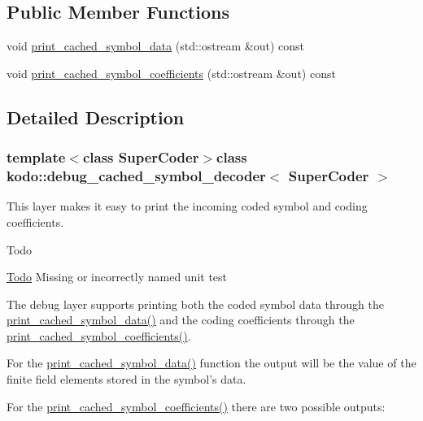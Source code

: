 \subsection*{Public Member Functions}
\begin{DoxyCompactItemize}
\item 
void \hyperlink{classkodo_1_1debug__cached__symbol__decoder_a1efd2cdeeaa51cf7ff3bb407ae0ffeba}{print\-\_\-cached\-\_\-symbol\-\_\-data} (std\-::ostream \&out) const 
\item 
void \hyperlink{classkodo_1_1debug__cached__symbol__decoder_ab805295f514e7fbfac57b8a6d6f45a62}{print\-\_\-cached\-\_\-symbol\-\_\-coefficients} (std\-::ostream \&out) const 
\end{DoxyCompactItemize}


\subsection{Detailed Description}
\subsubsection*{template$<$class Super\-Coder$>$class kodo\-::debug\-\_\-cached\-\_\-symbol\-\_\-decoder$<$ Super\-Coder $>$}

This layer makes it easy to print the incoming coded symbol and coding coefficients. 

\begin{DoxyRefDesc}{Todo}
\item[\hyperlink{todo__todo000005}{Todo}]Missing or incorrectly named unit test\end{DoxyRefDesc}
The debug layer supports printing both the coded symbol data through the \hyperlink{classkodo_1_1debug__cached__symbol__decoder_a1efd2cdeeaa51cf7ff3bb407ae0ffeba}{print\-\_\-cached\-\_\-symbol\-\_\-data()} and the coding coefficients through the \hyperlink{classkodo_1_1debug__cached__symbol__decoder_ab805295f514e7fbfac57b8a6d6f45a62}{print\-\_\-cached\-\_\-symbol\-\_\-coefficients()}.

For the \hyperlink{classkodo_1_1debug__cached__symbol__decoder_a1efd2cdeeaa51cf7ff3bb407ae0ffeba}{print\-\_\-cached\-\_\-symbol\-\_\-data()} function the output will be the value of the finite field elements stored in the symbol's data.

For the \hyperlink{classkodo_1_1debug__cached__symbol__decoder_ab805295f514e7fbfac57b8a6d6f45a62}{print\-\_\-cached\-\_\-symbol\-\_\-coefficients()} there are two possible outputs\-:

